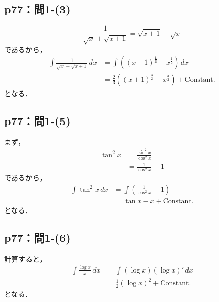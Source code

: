 \documentclass[uplatex,dvipdfmx,a4paper,10pt,fleqn]{jsarticle}
\newenvironment{tleftbar}{\begin{tbleftline}\setlength{\parindent}{1zw}}{\end{tbleftline}}
\begin{document}
\subsection*{p77：問1-(3)}

\begin{tleftbar}
    \[
        \frac{1}{\sqrt{x}+\sqrt{x+1}} = \sqrt{x+1}-\sqrt{x}
    \]
    であるから，
    \begin{align*} 
        \int \frac{1}{\sqrt{x}+\sqrt{x+1}} \, dx & = \int ( (x+1)^\frac{1}{2} -x^\frac{1}{2} ) \, dx \\
        & = \frac{2}{3} ( (x+1)^\frac{3}{2} - x^\frac{3}{2} ) + \mathrm{Constant.}
    \end{align*} 
    となる．
\end{tleftbar}


\subsection*{p77：問1-(5)}

\begin{tleftbar}
    まず，
    \begin{align*} 
        \tan ^2 x &= \frac{\sin^2 x}{\cos ^2 x} \\
        & = \frac{1}{\cos ^2 x}-1
    \end{align*} 
    であるから，
    \begin{align*} 
        \int \tan ^2 x \, dx & = \int \left (  \frac{1}{\cos ^2 x}-1 \right) \\
        & = \tan x -x +\mathrm{Constant.}
    \end{align*} 
    となる．
\end{tleftbar}

\subsection*{p77：問1-(6)}

\begin{tleftbar}
    計算すると，
    \begin{align*} 
        \int \frac{\log x}{x} \, dx & =\int (\log x) (\log x)' \, dx \\
        & = \frac{1}{2} (\log x)^2 + \mathrm{Constant.}
    \end{align*} 
    となる．
\end{tleftbar}
\end{document}

